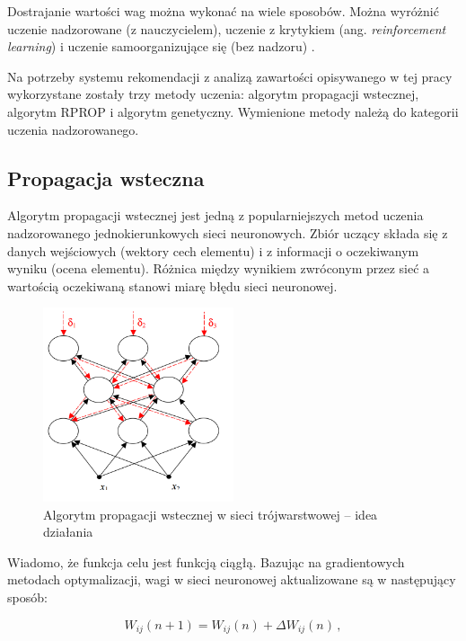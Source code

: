 \documentclass[twoside]{iisthesis}
\begin{document}
		 Dostrajanie wartości wag można wykonać na wiele sposobów. Można wyróżnić uczenie nadzorowane (z nauczycielem), uczenie z krytykiem (ang. \textit{reinforcement learning}) i uczenie samoorganizujące się (bez nadzoru) \cite{osowski1996sieci}.
		 
		 Na potrzeby systemu rekomendacji z analizą zawartości opisywanego w tej pracy wykorzystane zostały trzy metody uczenia: algorytm propagacji wstecznej, algorytm RPROP i algorytm genetyczny. Wymienione metody należą do kategorii uczenia nadzorowanego. 
		 
		 
		 \subsection{Propagacja wsteczna}
	 
		 Algorytm propagacji wstecznej jest jedną z popularniejszych metod uczenia nadzorowanego jednokierunkowych sieci neuronowych. Zbiór uczący składa się z danych wejściowych (wektory cech elementu) i z informacji o oczekiwanym wyniku (ocena elementu). Różnica między wynikiem zwróconym przez sieć a wartością oczekiwaną stanowi miarę błędu sieci neuronowej. 
		 
		 \begin{figure}[!ht] 
	 		 	\centering
	 		 	\includegraphics[width=0.5\textwidth]{ilustracjabackprop}
	 		 	\caption{Algorytm propagacji wstecznej w sieci trójwarstwowej -- idea działania \protect\cite{kwateralgorytmy}}
	 		 	\label{fig:ilustracjabackprop}
		 \end{figure}
		 
		 Wiadomo, że funkcja celu jest funkcją ciągłą. Bazując na gradientowych metodach optymalizacji, wagi w sieci neuronowej aktualizowane są w następujący sposób:	 
		 
 		 \begin{equation}
 		 \label{eq:weightadaptation3}
 		 W_{ij}(n+1) = W_{ij}(n) + \Delta W_{ij}(n) 
 		 \,,
 		 \end{equation}
 		 
\end{document}
